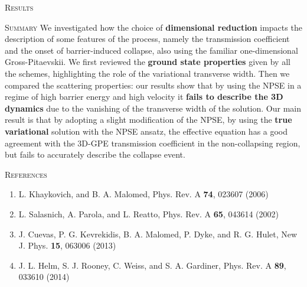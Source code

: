\documentclass[final]{beamer}
\newlength{\colwidth}
\begin{document}
\begin{frame}[t]
\begin{columns}[t]
\begin{column}{\colwidth}
\begin{block}{\textsc{Results}}
\begin{figure}
{          }
        \end{figure}
      \end{block}

      \begin{block}{\textsc{Summary}}
        We investigated how the choice of \textbf{dimensional reduction} impacts the description of some features of the process, namely the transmission coefficient and the onset of barrier-induced collapse, also using the familiar one-dimensional Gross-Pitaevskii. We first reviewed the \textbf{ground state properties} given by all the schemes, highlighting the role of the variational transverse width. Then we compared the scattering properties: our results show that by using the NPSE in a regime of high barrier energy and high velocity it \textbf{fails to describe the 3D dynamics} due to the vanishing of the transverse width of the solution. Our main result is that by adopting a slight modification of the NPSE, by using the \textbf{true variational} solution with the NPSE ansatz, the effective equation  has a good agreement with the 3D-GPE transmission coefficient in the non-collapsing region, but fails to accurately describe the collapse event.
      \end{block}
      \begin{block}{\textsc{References}}
        \printbibliography[heading=none]          
        \begin{enumerate}
            \item L. Khaykovich, and B. A. Malomed, Phys. Rev. A \textbf{74}, 023607 (2006)
            \item L. Salasnich, A. Parola, and L. Reatto, Phys. Rev. A \textbf{65}, 043614 (2002)
            \item J. Cuevas, P. G. Kevrekidis, B. A. Malomed, P. Dyke, and R. G. Hulet, New J. Phys. \textbf{15}, 063006 (2013)
            \item J. L. Helm, S. J. Rooney, C. Weiss, and S. A. Gardiner, Phys. Rev. A \textbf{89}, 033610 (2014)

\end{enumerate}
\end{block}
\end{column}
\end{columns}
\end{frame}
\end{document}
